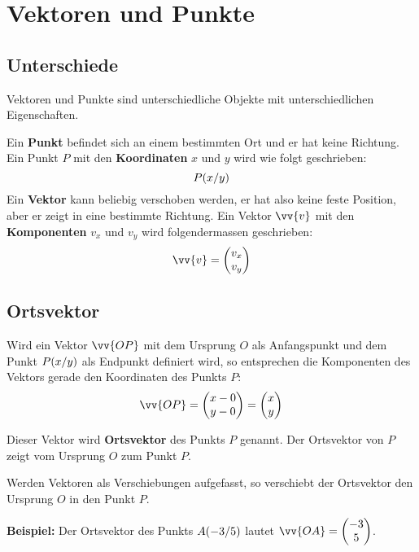 \newpage
\section{Vektoren und Punkte}

\subsection{Unterschiede}
Vektoren und Punkte sind unterschiedliche Objekte mit unterschiedlichen Eigenschaften.

Ein \textbf{Punkt} befindet sich an einem bestimmten Ort und er hat keine Richtung. Ein Punkt $P$ mit den \textbf{Koordinaten} $x$ und $y$ wird wie folgt geschrieben:
\[
  \pxy[P]{x,y}
\]
Ein \textbf{Vektor} kann beliebig verschoben werden, er hat also keine feste Position, aber er zeigt in eine bestimmte Richtung. Ein Vektor $\vv{v}$ mit den \textbf{Komponenten} $v_{x}$ und $v_{y}$ wird folgendermassen geschrieben:
\[
  \vv{v} = \vxy{v_{x},v_{y}}
\]

\subsection{Ortsvektor}

Wird ein Vektor $\vv{OP}$ mit dem Ursprung $O$ als Anfangspunkt und dem Punkt $\pxy[P]{x,y}$ als Endpunkt definiert wird, so entsprechen die Komponenten des Vektors gerade den Koordinaten des Punkts $P$:
\[
  \vv{OP} = \vxy{x-0,y-0} = \vxy{x,y}
\]
\begin{center}
\end{center}

Dieser Vektor wird \textbf{Ortsvektor} des Punkts $P$ genannt. Der Ortsvektor von $P$ zeigt vom Ursprung $O$ zum Punkt $P$.

Werden Vektoren als Verschiebungen aufgefasst, so verschiebt der Ortsvektor den Ursprung $O$ in den Punkt $P$.
\begin{example}
  \textbf{Beispiel:} Der Ortsvektor des Punkts $\pxy[A]{-3,5}$ lautet $\vv{OA} = \vxy{-3,5}$.
\end{example}

